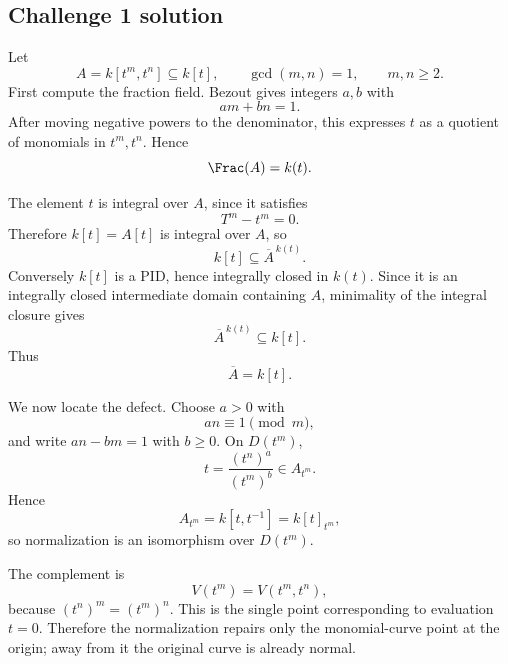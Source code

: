 
\subsection*{Challenge 1 solution}
\begin{solution}
Let
\[
A=k[t^m,t^n]\subseteq k[t],
\qquad
\gcd(m,n)=1,
\qquad
m,n\ge2.
\]
First compute the fraction field. Bezout gives integers \(a,b\) with
\[
am+bn=1.
\]
After moving negative powers to the denominator, this expresses \(t\) as a quotient of monomials in
\(t^m,t^n\). Hence
\[
\Frac(A)=k(t).
\]

The element \(t\) is integral over \(A\), since it satisfies
\[
T^m-t^m=0.
\]
Therefore \(k[t]=A[t]\) is integral over \(A\), so
\[
k[t]\subseteq\overline A^{\,k(t)}.
\]
Conversely \(k[t]\) is a PID, hence integrally closed in \(k(t)\). Since it is an integrally closed intermediate
domain containing \(A\), minimality of the integral closure gives
\[
\overline A^{\,k(t)}\subseteq k[t].
\]
Thus
\[
\boxed{\overline A=k[t].}
\]

We now locate the defect. Choose \(a>0\) with
\[
an\equiv1\pmod m,
\]
and write \(an-bm=1\) with \(b\ge0\). On \(D(t^m)\),
\[
t=\frac{(t^n)^a}{(t^m)^b}\in A_{t^m}.
\]
Hence
\[
A_{t^m}=k[t,t^{-1}]=k[t]_{t^m},
\]
so normalization is an isomorphism over \(D(t^m)\).

The complement is
\[
V(t^m)=V(t^m,t^n),
\]
because \((t^n)^m=(t^m)^n\). This is the single point corresponding to evaluation \(t=0\). Therefore the
normalization repairs only the monomial-curve point at the origin; away from it the original curve is already
normal.
\end{solution}

